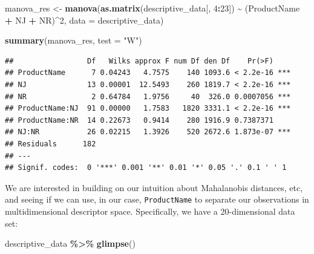 \documentclass[
]{book}
\newenvironment{Shaded}{\begin{snugshade}}{\end{snugshade}}
\newcommand{\AttributeTok}[1]{\textcolor[rgb]{0.13,0.29,0.53}{#1}}
\newcommand{\DecValTok}[1]{\textcolor[rgb]{0.00,0.00,0.81}{#1}}
\newcommand{\FunctionTok}[1]{\textcolor[rgb]{0.13,0.29,0.53}{\textbf{#1}}}
\newcommand{\NormalTok}[1]{#1}
\newcommand{\OtherTok}[1]{\textcolor[rgb]{0.56,0.35,0.01}{#1}}
\newcommand{\SpecialCharTok}[1]{\textcolor[rgb]{0.81,0.36,0.00}{\textbf{#1}}}
\newcommand{\StringTok}[1]{\textcolor[rgb]{0.31,0.60,0.02}{#1}}
\begin{document}
\begin{Shaded}
\begin{Highlighting}[]
\NormalTok{manova\_res }\OtherTok{\textless{}{-}} 
  \FunctionTok{manova}\NormalTok{(}\FunctionTok{as.matrix}\NormalTok{(descriptive\_data[, }\DecValTok{4}\SpecialCharTok{:}\DecValTok{23}\NormalTok{]) }\SpecialCharTok{\textasciitilde{}}\NormalTok{ (ProductName }\SpecialCharTok{+}\NormalTok{ NJ }\SpecialCharTok{+}\NormalTok{ NR)}\SpecialCharTok{\^{}}\DecValTok{2}\NormalTok{, }
         \AttributeTok{data =}\NormalTok{ descriptive\_data)}

\FunctionTok{summary}\NormalTok{(manova\_res, }\AttributeTok{test =} \StringTok{"W"}\NormalTok{)}
\end{Highlighting}
\end{Shaded}

\begin{verbatim}
##                 Df   Wilks approx F num Df den Df    Pr(>F)    
## ProductName      7 0.04243   4.7575    140 1093.6 < 2.2e-16 ***
## NJ              13 0.00001  12.5493    260 1819.7 < 2.2e-16 ***
## NR               2 0.64784   1.9756     40  326.0 0.0007056 ***
## ProductName:NJ  91 0.00000   1.7583   1820 3331.1 < 2.2e-16 ***
## ProductName:NR  14 0.22673   0.9414    280 1916.9 0.7387371    
## NJ:NR           26 0.02215   1.3926    520 2672.6 1.873e-07 ***
## Residuals      182                                             
## ---
## Signif. codes:  0 '***' 0.001 '**' 0.01 '*' 0.05 '.' 0.1 ' ' 1
\end{verbatim}

We are interested in building on our intuition about Mahalanobis distances, etc, and seeing if we can use, in our case, \texttt{ProductName} to separate our observations in multidimensional descriptor space. Specifically, we have a 20-dimensional data set:

\begin{Shaded}
\begin{Highlighting}[]
\NormalTok{descriptive\_data }\SpecialCharTok{\%\textgreater{}\%}
  \FunctionTok{glimpse}\NormalTok{()}
\end{Highlighting}
\end{Shaded}
\end{document}
